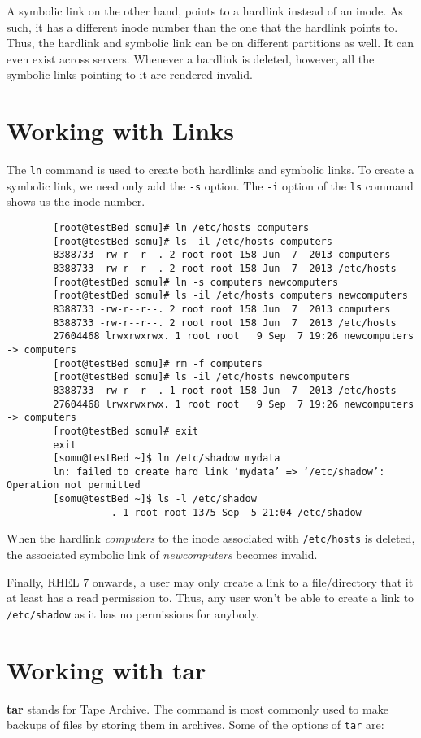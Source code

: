 \documentclass{report}
\begin{document}
	\noindent
	A symbolic link on the other hand, points to a hardlink instead of an inode. As such, it has a different inode number than the one that the hardlink points to. Thus, the hardlink and symbolic link can be on different partitions as well. It can even exist across servers. Whenever a hardlink is deleted, however, all the symbolic links pointing to it are rendered invalid.
	
	\section{Working with Links}
	The \verb|ln| command is used to create both hardlinks and symbolic links. To create a symbolic link, we need only add the \verb|-s| option. The \verb|-i| option of the \verb|ls| command shows us the inode number.
	
	\begin{verbatim}
		[root@testBed somu]# ln /etc/hosts computers
		[root@testBed somu]# ls -il /etc/hosts computers
		8388733 -rw-r--r--. 2 root root 158 Jun  7  2013 computers
		8388733 -rw-r--r--. 2 root root 158 Jun  7  2013 /etc/hosts
		[root@testBed somu]# ln -s computers newcomputers
		[root@testBed somu]# ls -il /etc/hosts computers newcomputers
		8388733 -rw-r--r--. 2 root root 158 Jun  7  2013 computers
		8388733 -rw-r--r--. 2 root root 158 Jun  7  2013 /etc/hosts
		27604468 lrwxrwxrwx. 1 root root   9 Sep  7 19:26 newcomputers -> computers
		[root@testBed somu]# rm -f computers
		[root@testBed somu]# ls -il /etc/hosts newcomputers
		8388733 -rw-r--r--. 1 root root 158 Jun  7  2013 /etc/hosts
		27604468 lrwxrwxrwx. 1 root root   9 Sep  7 19:26 newcomputers -> computers
		[root@testBed somu]# exit
		exit
		[somu@testBed ~]$ ln /etc/shadow mydata
		ln: failed to create hard link ‘mydata’ => ‘/etc/shadow’: Operation not permitted
		[somu@testBed ~]$ ls -l /etc/shadow
		----------. 1 root root 1375 Sep  5 21:04 /etc/shadow
	\end{verbatim}
	When the hardlink \textit{computers} to the inode associated with \texttt{/etc/hosts} is deleted, the associated symbolic link of \textit{newcomputers} becomes invalid.
	
	\noindent
	Finally, RHEL 7 onwards, a user may only create a link to a file/directory that it at least has a read permission to. Thus, any user won't be able to create a link to \texttt{/etc/shadow} as it has no permissions for anybody.
	
	\section{Working with tar}
	\textbf{tar} stands for Tape Archive. The command is most commonly used to make backups of files by storing them in archives. Some of the options of \verb|tar| are:
	
\end{document}
